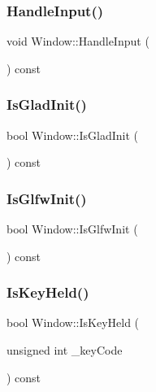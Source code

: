\subsubsection{\texorpdfstring{Handle\+Input()}{HandleInput()}}
{\footnotesize\ttfamily void Window\+::\+Handle\+Input (\begin{DoxyParamCaption}{ }\end{DoxyParamCaption}) const}

\mbox{\label{class_window_acd18a545a32f73ae1dc0c1bd00573f20}} 
\subsubsection{\texorpdfstring{Is\+Glad\+Init()}{IsGladInit()}}
{\footnotesize\ttfamily bool Window\+::\+Is\+Glad\+Init (\begin{DoxyParamCaption}{ }\end{DoxyParamCaption}) const}

\mbox{\label{class_window_a84c80356e911db086098e29e8a870829}} 
\subsubsection{\texorpdfstring{Is\+Glfw\+Init()}{IsGlfwInit()}}
{\footnotesize\ttfamily bool Window\+::\+Is\+Glfw\+Init (\begin{DoxyParamCaption}{ }\end{DoxyParamCaption}) const}

\mbox{\label{class_window_a2d13c2ec079ed3f8e907969781217c93}} 
\subsubsection{\texorpdfstring{Is\+Key\+Held()}{IsKeyHeld()}}
{\footnotesize\ttfamily bool Window\+::\+Is\+Key\+Held (\begin{DoxyParamCaption}\item[{unsigned int}]{\+\_\+key\+Code }\end{DoxyParamCaption}) const}


